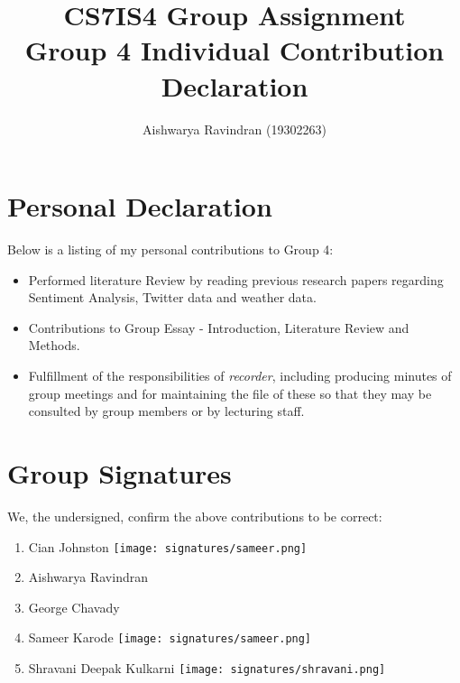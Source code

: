 \documentclass[a4paper,10pt]{article}
\begin{document}
\title{
    CS7IS4 Group Assignment \\
    \large Group 4 Individual Contribution Declaration
}
\author{
    Aishwarya Ravindran (19302263)
}

\maketitle

\section{Personal Declaration}

Below is a listing of my personal contributions to Group 4:

\begin{itemize}
    \item{
        Performed literature Review by reading previous research papers regarding Sentiment Analysis, Twitter data and weather data.
    }
    
    \item{
        Contributions to Group Essay - Introduction, Literature Review and Methods.
    }
    \item{
        Fulfillment of the responsibilities of \textit{recorder}, including producing minutes of group meetings and for maintaining the file of these so that they may be consulted by group members or by lecturing staff. 
    }
\end{itemize}

\section{Group Signatures}

We, the undersigned, confirm the above contributions to be correct:

\begin{enumerate}
    \item{
        Cian Johnston \texttt{[image: signatures/sameer.png]}
    }
    \item{
        Aishwarya Ravindran
    }
    \item{
        George Chavady
    }
    \item{
        Sameer Karode \texttt{[image: signatures/sameer.png]}
    }
    \item{
        Shravani Deepak Kulkarni \texttt{[image: signatures/shravani.png]}
    }

\end{enumerate}
\end{document}
